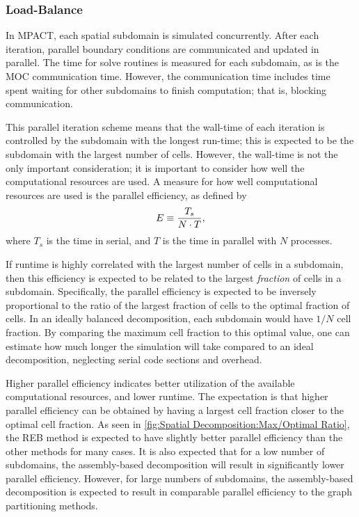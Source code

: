 {{{      %
      \subsubsection{Load-Balance}{\label{sssec:Spatial Decomposition:Load-Balance}
        In MPACT, each spatial subdomain is simulated concurrently.
        After each iteration, parallel boundary conditions are communicated and updated in parallel.
        The time for solve routines is measured for each subdomain, as is the \ac{MOC} communication time.
        However, the communication time includes time spent waiting for other subdomains to finish computation; that is, blocking communication.

        This parallel iteration scheme means that the wall-time of each iteration is controlled by the subdomain with the longest run-time; this is expected to be the subdomain with the largest number of cells.
        However, the wall-time is not the only important consideration; it is important to consider how well the computational resources are used.
        A measure for how well computational resources are used is the parallel efficiency, as defined by
        \begin{equation}
            \label{eq:Spatial Decomposition:Parallel Efficiency}
            E \equiv \frac{T_s}{N \cdot T},
        \end{equation}
        where $T_s$ is the time in serial, and $T$ is the time in parallel with $N$ processes.

        If runtime is highly correlated with the largest number of cells in a subdomain, then this efficiency is expected to be related to the largest \emph{fraction} of cells in a subdomain.
        Specifically, the parallel efficiency is expected to be inversely proportional to the ratio of the largest fraction of cells to the optimal fraction of cells.
        In an ideally balanced decomposition, each subdomain would have $1/N$ cell fraction.
        By comparing the maximum cell fraction to this optimal value, one can estimate how much longer the simulation will take compared to an ideal decomposition, neglecting serial code sections and overhead.

        Higher parallel efficiency indicates better utilization of the available computational resources, and lower runtime.
        The expectation is that higher parallel efficiency can be obtained by having a largest cell fraction closer to the optimal cell fraction.
        As seen in \cref{fig:Spatial Decomposition:Max/Optimal Ratio}, the \ac{REB} method is expected to have slightly better parallel efficiency than the other methods for many cases.
        It is also expected that for a low number of subdomains, the assembly-based decomposition will result in significantly lower parallel efficiency.
        However, for large numbers of subdomains, the assembly-based decomposition is expected to result in comparable parallel efficiency to the graph partitioning methods.

}}}}
